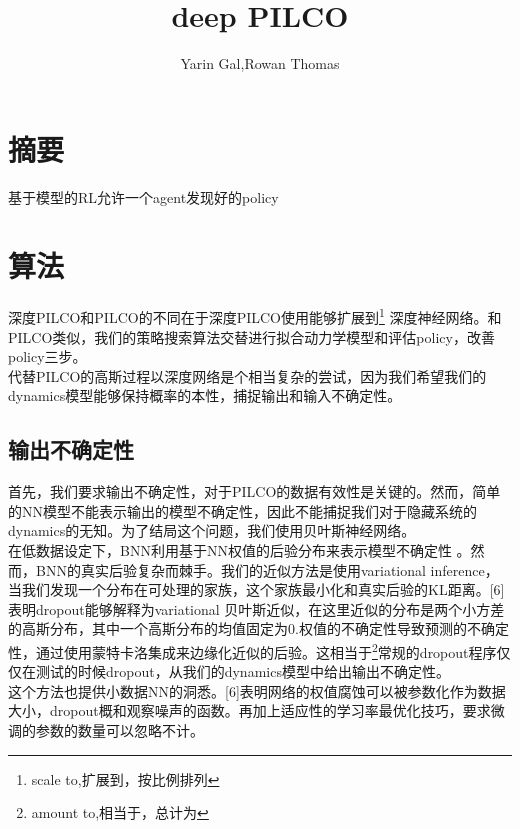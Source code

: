 \documentclass[2pt,a4paper]{article}
\title{deep PILCO}
\begin{document}
\author{Yarin Gal,Rowan Thomas}
\section{摘要}
基于模型的RL允许一个agent发现好的policy
\section{算法}
深度PILCO和PILCO的不同在于深度PILCO使用能够扩展到\footnote{scale to,扩展到，按比例排列} 深度神经网络。和PILCO类似，我们的策略搜索算法交替进行拟合动力学模型和评估policy，改善policy三步。\\
代替PILCO的高斯过程以深度网络是个相当复杂的尝试，因为我们希望我们的dynamics模型能够保持概率的本性，捕捉输出和输入不确定性。
\subsection{输出不确定性}
首先，我们要求输出不确定性，对于PILCO的数据有效性是关键的。然而，简单的NN模型不能表示输出的模型不确定性，因此不能捕捉我们对于隐藏系统的dynamics的无知。为了结局这个问题，我们使用贝叶斯神经网络。\\
在低数据设定下，BNN利用基于NN权值的后验分布来表示模型不确定性 。然而，BNN的真实后验复杂而棘手。我们的近似方法是使用variational inference，当我们发现一个分布在可处理的家族，这个家族最小化和真实后验的KL距离。[6]表明dropout能够解释为variational 贝叶斯近似，在这里近似的分布是两个小方差的高斯分布，其中一个高斯分布的均值固定为0.权值的不确定性导致预测的不确定性，通过使用蒙特卡洛集成来边缘化近似的后验。这相当于\footnote{amount to,相当于，总计为}常规的dropout程序仅仅在测试的时候dropout，从我们的dynamics模型中给出输出不确定性。\\
这个方法也提供小数据NN的洞悉。[6]表明网络的权值腐蚀可以被参数化作为数据大小，dropout概和观察噪声的函数。再加上适应性的学习率最优化技巧，要求微调的参数的数量可以忽略不计。\\
\end{document}
